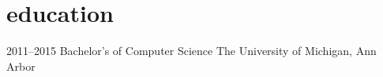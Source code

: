 \section{education}

\begin{entrylist}
\entry
{2011--2015}
{Bachelor's {\normalfont of Computer Science}}
{The University of Michigan, Ann Arbor}
{}
\end{entrylist}
